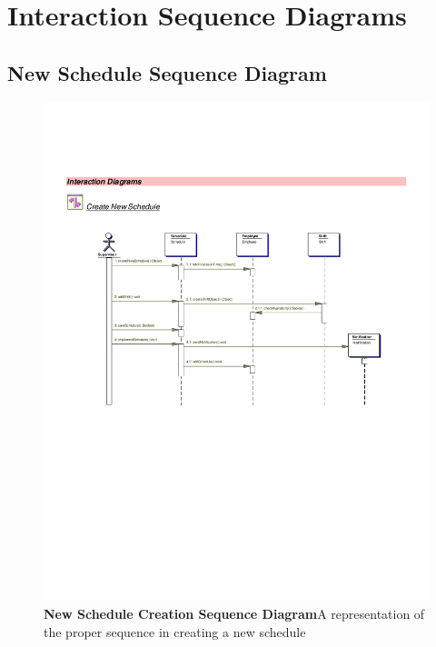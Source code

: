 \documentclass[letterpaper,12pt]{report}
\begin{document}
\clearpage
\chapter{Interaction Sequence Diagrams}
\newpage

\section{New Schedule Sequence Diagram}
\begin{figure}[hbp]
 \includegraphics[trim=20mm 80mm 25mm 45mm]{diagrams/seq1.pdf}
 \caption{\small
\textbf{New Schedule Creation Sequence Diagram}\newline A representation of the proper sequence in creating a new schedule}\label{fig:seq1}
\end{figure}
\newpage
\end{document}
